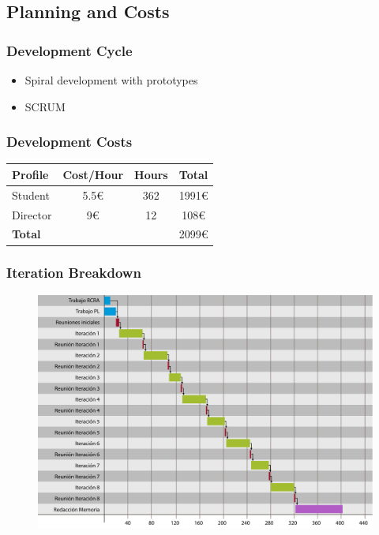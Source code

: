 \documentclass[english]{beamer}
\begin{document}
\subsection{Planning and Costs}
	\begin{frame}
		\frametitle{Development Cycle}
		\begin{itemize}
			\item Spiral development with prototypes
			\item SCRUM
		\end{itemize}
	\end{frame}
	\begin{frame}
		\frametitle{Development Costs}
		\begin{table}
		\centering
			\begin{tabular}{ | l | c | c | c |}
				\hline
				\textbf{Profile} & \textbf{Cost/Hour} & \textbf{Hours} & \textbf{Total} \\ \hline
				Student & 5.5\euro{} & 362 & 1991\euro{} \\ \hline
				Director  & 9\euro{} & 12 & 108\euro{} \\ \hline
				\textbf{Total} & & & 2099\euro{} \\ \hline
			\end{tabular}
		\end{table}
	\end{frame}
	\begin{frame}
		\frametitle{Iteration Breakdown}
		\begin{figure}
		\centering
		\includegraphics[width=0.8\linewidth]{imagenes/diagrama_tareas.pdf}
		\end{figure}
	\end{frame}
\end{document}
